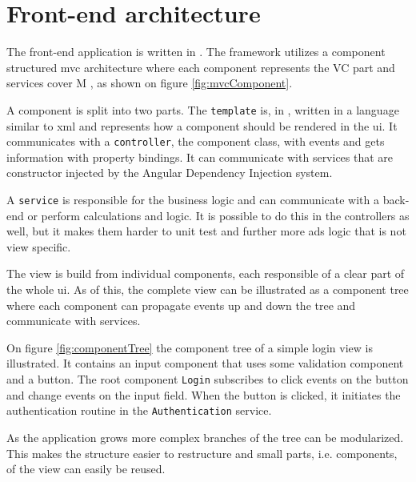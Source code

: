 
\section{Front-end architecture}
The front-end application is written in .
The framework utilizes a component structured \gls{mvc} architecture where each component represents the VC part and services cover M \citep{architecture:ng}, as shown on figure \ref{fig:mvcComponent}.

A component is split into two parts.
The \verb+template+ is, in , written in a language similar to \gls{xml} and represents how a component should be rendered in the \gls{ui}.
It communicates with a \verb+controller+, the component class, with events and gets information with property bindings.
It can communicate with services that are constructor injected by the Angular Dependency Injection system.

A \verb+service+ is responsible for the business logic and can communicate with a back-end or perform calculations and logic.
It is possible to do this in the controllers as well, but it makes them harder to unit test and further more ads logic that is not view specific.


The view is build from individual components, each responsible of a clear part of the whole \gls{ui}.
As of this, the complete view can be illustrated as a component tree where each component can propagate events up and down the tree and communicate with services.

On figure \ref{fig:componentTree} the component tree of a simple login view is illustrated.
It contains an input component that uses some validation component and a button.
The root component \verb+Login+ subscribes to click events on the button and change events on the input field.
When the button is clicked, it initiates the authentication routine in the \verb+Authentication+ service.

As the application grows more complex branches of the tree can be modularized.
This makes the structure easier to restructure and small parts, i.e. components, of the view can easily be reused.







